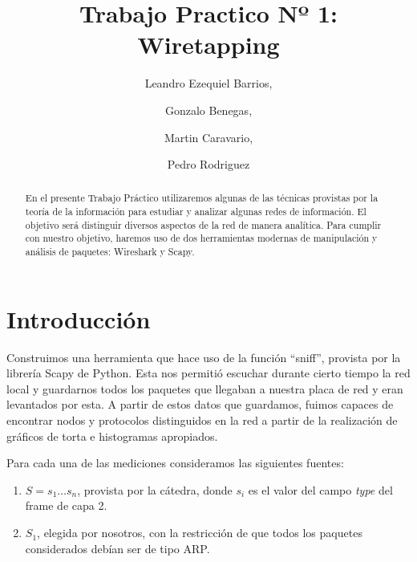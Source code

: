 \documentclass[final,narroweqnarray,inline]{ieee}
\begin{document}
\title[Trabajo Practico Nº 1: Wiretapping]{%
       Trabajo Practico Nº 1: Wiretapping}

\author[SHORT NAMES]{%
	Leandro Ezequiel Barrios,
	\and
	Gonzalo Benegas,
	\and
	Martin Caravario, 
	\and
	Pedro Rodriguez 
}

\maketitle               

\begin{abstract}
En el presente Trabajo Práctico utilizaremos algunas de las técnicas
provistas por la teoría de la información para estudiar y analizar algunas
redes de información. El objetivo será distinguir diversos aspectos de la
red de manera analítica. Para cumplir con nuestro objetivo, haremos uso de
dos herramientas modernas de manipulación y análisis de paquetes: Wireshark
y Scapy.
\end{abstract}



%
\section{ Introducción }

Construimos una herramienta que hace uso de la
función ``sniff'', provista por la librería Scapy de Python. Esta nos permitió escuchar durante
cierto tiempo la red local y guardarnos todos los paquetes que llegaban a
nuestra placa de red y eran levantados por esta. A partir de estos datos
que guardamos, fuimos capaces de encontrar  nodos y protocolos
distinguidos en la red a partir de la realización de gráficos de torta e histogramas apropiados.

Para cada una de las mediciones consideramos las siguientes fuentes: 
\begin{enumerate}
  \item $S = {s_{1} \dots s_{n}}$, provista por la cátedra, donde $s_{i}$ es el valor del campo
        \emph{type} del frame de capa 2. 
  \item $S_{1}$, elegida por nosotros, con la restricción de que todos los paquetes considerados
        debían ser de tipo ARP.
\end{enumerate}
\end{document}
